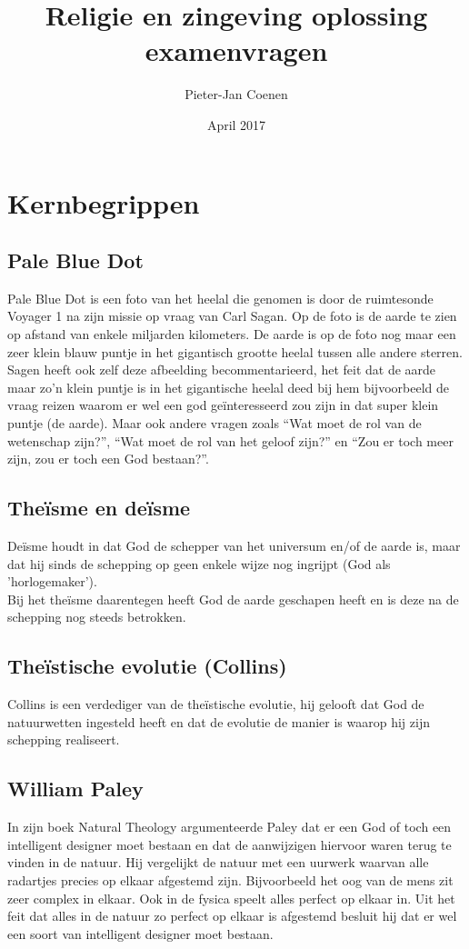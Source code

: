 \documentclass[11pt,a4paper,titlepage]{article}
\title{Religie en zingeving oplossing examenvragen}
\author{Pieter-Jan Coenen}
\date{April 2017}
\begin{document}
\maketitle
\newpage
\tableofcontents
\newpage

\section{Kernbegrippen}
\subsection{Pale Blue Dot}
Pale Blue Dot is een foto van het heelal die genomen is door de ruimtesonde Voyager 1 na zijn missie op vraag van Carl Sagan. Op de foto is de aarde te zien op afstand van enkele miljarden kilometers. De aarde is op de foto nog maar een zeer klein blauw puntje in het gigantisch grootte heelal tussen alle andere sterren.\\
Sagen heeft ook zelf deze afbeelding becommentarieerd, het feit dat de aarde maar zo'n klein puntje is in het gigantische heelal deed bij hem bijvoorbeeld de vraag reizen waarom er wel een god geïnteresseerd zou zijn in dat super klein puntje (de aarde). Maar ook andere vragen zoals ``Wat moet de rol van de wetenschap zijn?'', ``Wat moet de rol van het geloof zijn?''  en ``Zou er toch meer zijn, zou er toch een God bestaan?''.

\subsection{Theïsme en deïsme}
Deïsme houdt in dat God de schepper van het universum en/of de aarde is, maar dat hij sinds de schepping op geen enkele wijze nog ingrijpt (God als 'horlogemaker').\\ Bij het theïsme daarentegen heeft God de aarde geschapen heeft en is deze na de schepping nog steeds betrokken.
\subsection{Theïstische evolutie (Collins)}
Collins is een verdediger van de theïstische evolutie, hij gelooft dat God de natuurwetten ingesteld heeft en dat de evolutie de manier is waarop hij zijn schepping realiseert.

\subsection{William Paley}
In zijn boek Natural Theology argumenteerde Paley dat er een God of toch een intelligent designer moet bestaan en dat de aanwijzigen hiervoor waren terug te vinden in de natuur. Hij vergelijkt de natuur met een uurwerk waarvan alle radartjes precies op elkaar afgestemd zijn. Bijvoorbeeld het oog van de mens zit zeer complex in elkaar.  Ook in de fysica speelt alles perfect op elkaar in. Uit het feit dat alles in de natuur zo perfect op elkaar is afgestemd besluit hij dat er wel een soort van intelligent designer moet bestaan.
\end{document}
